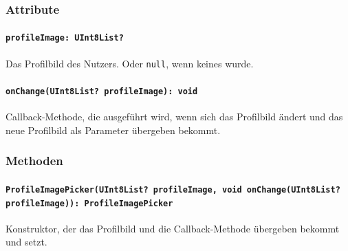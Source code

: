 \documentclass{entwurfsheft}
\begin{document}
\begin{sloppypar}
\subsubsection*{Attribute}
\paragraph{\texttt{profileImage: UInt8List?}}
Das Profilbild des Nutzers. Oder \texttt{null}, wenn keines wurde.
\paragraph{\texttt{onChange(UInt8List? profileImage): void}}
Callback-Methode, die ausgeführt wird, wenn sich das Profilbild ändert und das neue Profilbild als Parameter übergeben bekommt.
\subsubsection*{Methoden}
\paragraph{\texttt{ProfileImagePicker(UInt8List? profileImage, void onChange(UInt8List? profileImage)): ProfileImagePicker}}
Konstruktor, der das Profilbild und die Callback-Methode übergeben bekommt und setzt.
\newpage

\end{sloppypar}
\end{document}
